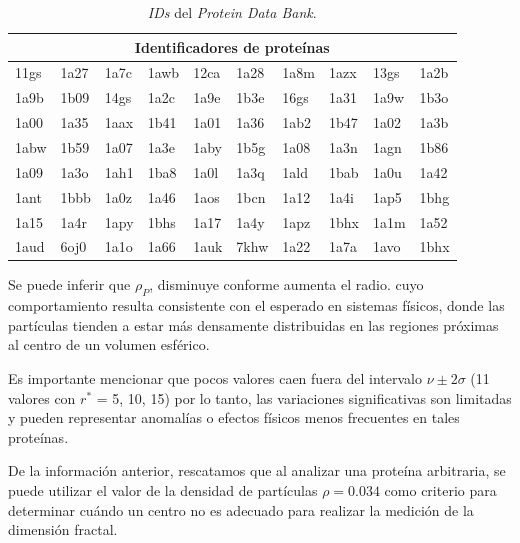  	\begin{table}[h!]
 		\centering
 		\begin{tabular}{llllllllll}
 			\multicolumn{10}{c}{Identificadores de prote\'{i}nas} \\ 
 			\hline
 			11gs & 1a27 & 1a7c & 1awb & 12ca & 1a28 & 1a8m & 1azx & 13gs & 1a2b \\
 			1a9b & 1b09 & 14gs & 1a2c & 1a9e & 1b3e & 16gs & 1a31 & 1a9w & 1b3o \\
 			1a00 & 1a35 & 1aax & 1b41 & 1a01 & 1a36 & 1ab2 & 1b47 & 1a02 & 1a3b \\
 			1abw & 1b59 & 1a07 & 1a3e & 1aby & 1b5g & 1a08 & 1a3n & 1agn & 1b86 \\
 			1a09 & 1a3o & 1ah1 & 1ba8 & 1a0l & 1a3q & 1ald & 1bab & 1a0u & 1a42 \\
 			1ant & 1bbb & 1a0z & 1a46 & 1aos & 1bcn & 1a12 & 1a4i & 1ap5 & 1bhg \\
 			1a15 & 1a4r & 1apy & 1bhs & 1a17 & 1a4y & 1apz & 1bhx & 1a1m & 1a52 \\
 			1aud & 6oj0 & 1a1o & 1a66 & 1auk & 7khw & 1a22 & 1a7a & 1avo & 1bhx \\
 			\hline
 		\end{tabular}
 		\caption{\emph{IDs} del \emph{Protein Data Bank}.}
 		\label{Tabla:ids79}
 	\end{table}
 	
 	Se puede inferir que $\rho_P$, disminuye conforme aumenta el radio. cuyo comportamiento resulta consistente con el esperado en sistemas físicos, donde las partículas tienden a estar más densamente distribuidas en las regiones próximas al centro de un volumen esférico.
 	
 	Es importante mencionar que pocos valores caen fuera del intervalo $\nu \pm 2\sigma$ (11 valores con $r^*$ = 5, 10, 15) por lo tanto, las variaciones significativas son limitadas y pueden representar anomalías o efectos físicos menos frecuentes en tales prote\'{i}nas.
 	
 	De la informaci\'{o}n anterior, rescatamos que al analizar una prote\'{i}na arbitraria, se puede utilizar el valor de la densidad de part\'{i}culas $\rho = 0.034$ como criterio para determinar cu\'{a}ndo un centro no es adecuado para realizar la medici\'{o}n de la dimensi\'{o}n fractal. 
 	

